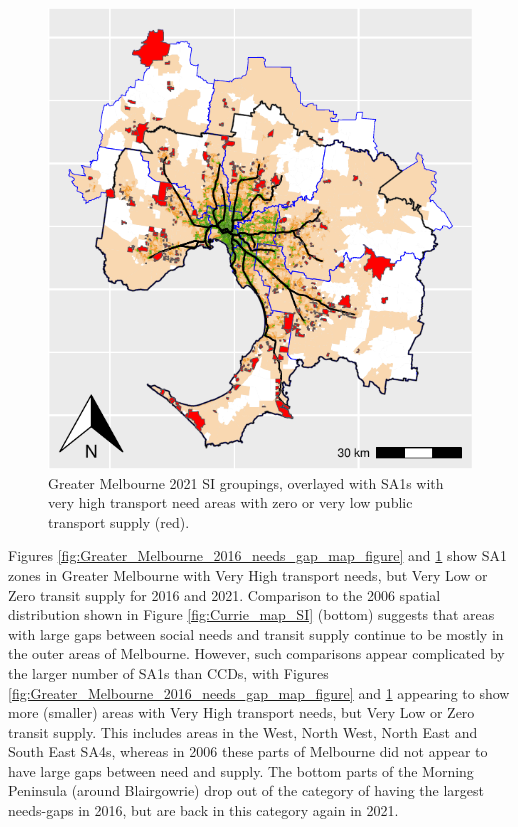 \documentclass[preprint, 3p,
authoryear]{elsarticle} %
\begin{document}
\begin{figure}
\includegraphics[width=1\linewidth]{ReynoldsCurrieQu2024_files/figure-latex/Greater_Melbourne_2021_needs_gap_map_figure-1} \caption{Greater Melbourne 2021 SI groupings, overlayed with SA1s with very high transport need areas with zero or very low public transport supply (red).}\label{fig:Greater_Melbourne_2021_needs_gap_map_figure}
\end{figure}

Figures \ref{fig:Greater_Melbourne_2016_needs_gap_map_figure} and
\ref{fig:Greater_Melbourne_2021_needs_gap_map_figure} show SA1 zones in
Greater Melbourne with Very High transport needs, but Very Low or Zero
transit supply for 2016 and 2021. Comparison to the 2006 spatial
distribution shown in Figure \ref{fig:Currie_map_SI} (bottom) suggests
that areas with large gaps between social needs and transit supply
continue to be mostly in the outer areas of Melbourne. However, such
comparisons appear complicated by the larger number of SA1s than CCDs,
with Figures \ref{fig:Greater_Melbourne_2016_needs_gap_map_figure} and
\ref{fig:Greater_Melbourne_2021_needs_gap_map_figure} appearing to show
more (smaller) areas with Very High transport needs, but Very Low or
Zero transit supply. This includes areas in the West, North West, North
East and South East SA4s, whereas in 2006 these parts of Melbourne did
not appear to have large gaps between need and supply. The bottom parts
of the Morning Peninsula (around Blairgowrie) drop out of the category
of having the largest needs-gaps in 2016, but are back in this category
again in 2021.
\end{document}
